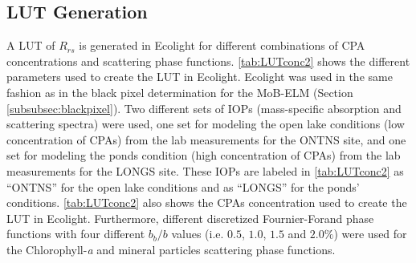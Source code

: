 \documentclass[onecolumn,3p,letterpaper]{elsarticle}
\begin{document}
\subsection{LUT Generation}
\label{subsec:LUT}
A LUT of $R_{rs}$ is generated in Ecolight for different combinations of CPA concentrations and scattering phase functions. \autoref{tab:LUTconc2} shows the different parameters used to create the LUT in Ecolight. Ecolight was used in the same fashion as in the black pixel determination for the MoB-ELM (Section \ref{subsubsec:blackpixel}). Two different sets of IOPs (mass-specific absorption and scattering spectra) were used, one set for modeling the open lake conditions (low concentration of CPAs) from the lab measurements for the ONTNS site, and one set for modeling the ponds condition (high concentration of CPAs) from the lab measurements for the LONGS site. These IOPs are labeled in \autoref{tab:LUTconc2} as ``ONTNS'' for the open lake conditions and as ``LONGS'' for the ponds' conditions. \autoref{tab:LUTconc2} also shows the CPAs concentration used to create the LUT in Ecolight. Furthermore, different discretized Fournier-Forand phase functions with four different $b_b/b$ values (i.e. $0.5$, $1.0$, $1.5$ and $2.0\%$) were used for the Chlorophyll-{\it a} and mineral particles scattering phase functions.
\end{document}
